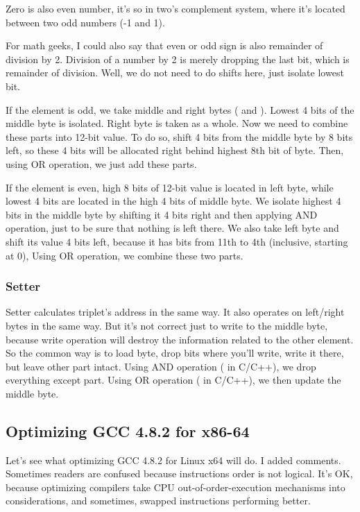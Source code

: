 Zero is also even number, it's so in two's complement system,
where it's located between two odd numbers (-1 and 1).

For math geeks, I could also say that even or odd sign is also remainder of division by 2.
Division of a number by 2 is merely dropping the last bit, which is remainder of division.
Well, we do not need to do shifts here, just isolate lowest bit.

If the element is odd, we take middle and right bytes ( and ).
Lowest 4 bits of the middle byte is isolated.
Right byte is taken as a whole.
Now we need to combine these parts into 12-bit value.
To do so, shift 4 bits from the middle byte by 8 bits left, so these 4 bits will be allocated right behind highest 8th bit of byte.
Then, using OR operation, we just add these parts.

If the element is even, high 8 bits of 12-bit value is located in left byte, while lowest 4 bits are located in the high 4 bits of middle byte.
We isolate highest 4 bits in the middle byte by shifting it 4 bits right and then applying AND operation, just to be sure that nothing is left there.
We also take left byte and shift its value 4 bits left, because it has bits from 11th to 4th (inclusive, starting at 0),
Using OR operation, we combine these two parts.

\subsubsection{Setter}

Setter calculates triplet's address in the same way.
It also operates on left/right bytes in the same way.
But it's not correct just to write to the middle byte, because write operation will destroy the information related to the other element.
So the common way is to load byte, drop bits where you'll write, write it there, but leave other part intact.
Using AND operation (\TT{\&} in C/C++), we drop everything except  part.
Using OR operation (\TT{|} in C/C++), we then update the middle byte.

\subsection{Optimizing GCC 4.8.2 for x86-64}

Let's see what optimizing GCC 4.8.2 for Linux x64 will do.
I added comments.
Sometimes readers are confused because instructions order is not logical.
It's OK, because optimizing compilers take CPU out-of-order-execution mechanisms into considerations, and sometimes,
swapped instructions performing better.

